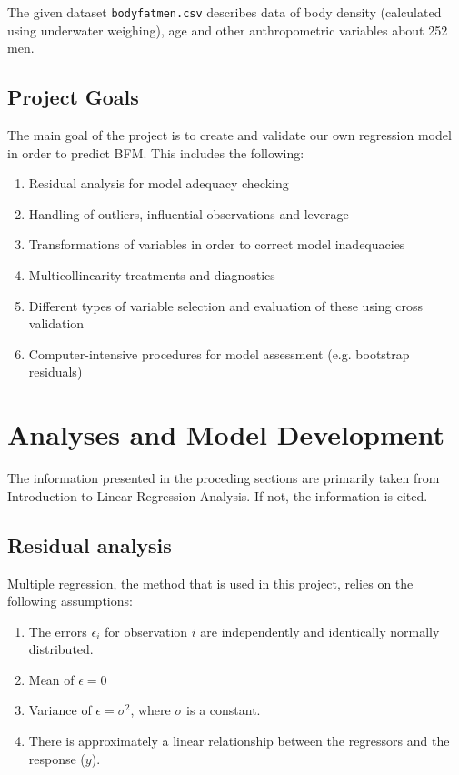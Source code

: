 \documentclass[11pt]{article}
\begin{document}
The given dataset \texttt{bodyfatmen.csv} describes data of body density (calculated using underwater weighing), 
age and other anthropometric variables about 252 men.

\subsection{Project Goals}
\label{sec:orgf1c33c4}

The main goal of the project is to create and validate our own regression model in order to predict BFM.
This includes the following:

\begin{enumerate}
\item Residual analysis for model adequacy checking
\item Handling of outliers, influential observations and leverage
\item Transformations of variables in order to correct model inadequacies
\item Multicollinearity treatments and diagnostics
\item Different types of variable selection and evaluation of these using cross validation
\item Computer-intensive procedures for model assessment (e.g. bootstrap residuals)
\end{enumerate}

\newpage
\section{Analyses and Model Development}
\label{sec:orga39c017}

The information presented in the proceding sections are primarily taken from Introduction to
Linear Regression Analysis. \cite{Montgomery2012} If not, the information is cited.

\subsection{Residual analysis}
\label{sec:org792bde0}

Multiple regression, the method that is used in this project, relies on the following assumptions:

\begin{enumerate}
\item The errors \(\epsilon_i\) for observation \(i\) are independently and identically normally distributed.
\item Mean of \(\epsilon = 0\)
\item Variance of \(\epsilon = \sigma^2\), where \(\sigma\) is a constant.
\item There is approximately a linear relationship between the regressors and the response (\(y\)).
\end{enumerate}
\end{document}
